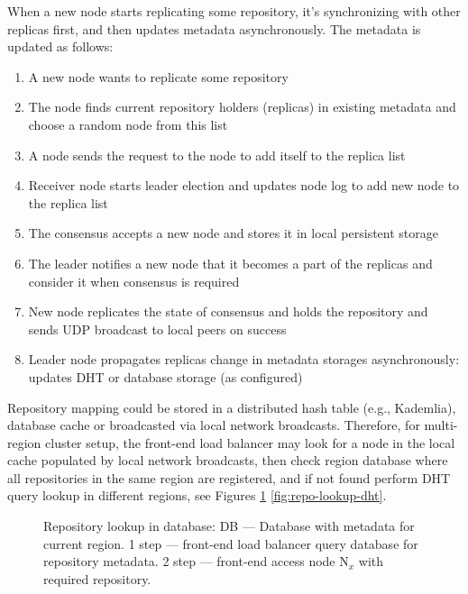 \documentclass[acmlarge, screen, nonacm, 11pt]{acmart}
\begin{document}
When a new node starts replicating some repository, it's synchronizing with other replicas first, and then
updates metadata asynchronously. The metadata is updated as follows:
\begin{enumerate}
  \item A new node wants to replicate some repository
  \item The node finds current repository holders (replicas) in existing metadata and choose a random node from this list
  \item A node sends the request to the node to add itself to the replica list
  \item Receiver node starts leader election and updates node log to add new node to the replica list
  \item The consensus accepts a new node and stores it in local persistent storage
  \item The leader notifies a new node that it becomes a part of the replicas and consider it when consensus is required
  \item New node replicates the state of consensus and holds the repository and sends UDP broadcast to
    local peers on success
  \item Leader node propagates replicas change in metadata storages asynchronously: updates DHT or database storage
    (as configured)
\end{enumerate}

Repository mapping could be stored in a distributed hash table (e.g., Kademlia),
database cache or broadcasted via local network broadcasts.
Therefore, for multi-region cluster setup, the front-end load balancer may look for a node in the local cache
populated by local network broadcasts, then check region database where all repositories in the same region are
registered, and if not found perform DHT query lookup in different regions,
see Figures \ref{fig:repo-lookup-db} \ref{fig:repo-lookup-dht}.

\begin{figure}
  \begin{center}
  \end{center}
  \caption{
    Repository lookup in database:
    DB --- Database with metadata for current region.
    1 step --- front-end load balancer query database for repository metadata.
    2 step --- front-end access node N$_{x}$ with required repository.
  }\label{fig:repo-lookup-db}
\end{figure}
\end{document}
